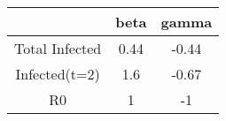 \begin{tabular}{|c|c|c|}
\hline
& beta & gamma \\
\hline
Total Infected & 0.44 & -0.44 \\
\hline
Infected(t=2) & 1.6 & -0.67 \\
\hline
R0 & 1 & -1 \\
\hline
\end{tabular}
